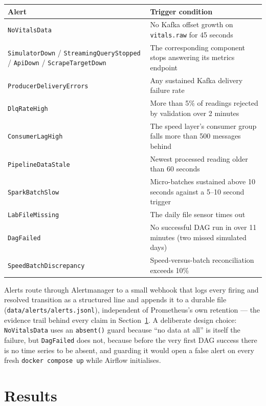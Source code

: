 \documentclass[11pt,a4paper]{article}
\newcommand{\code}[1]{\texttt{\small #1}}
\begin{document}
\begin{longtable}{@{}L{4.5cm}L{10cm}@{}}
\toprule
\textbf{Alert} & \textbf{Trigger condition} \\
\midrule
\endhead
\code{NoVitalsData} & No Kafka offset growth on \code{vitals.raw} for 45 seconds \\
\code{SimulatorDown} / \code{StreamingQueryStopped} / \code{ApiDown} / \code{ScrapeTargetDown} & The corresponding component stops answering its metrics endpoint \\
\code{ProducerDeliveryErrors} & Any sustained Kafka delivery failure rate \\
\code{DlqRateHigh} & More than 5\% of readings rejected by validation over 2 minutes \\
\code{ConsumerLagHigh} & The speed layer's consumer group falls more than 500 messages behind \\
\code{PipelineDataStale} & Newest processed reading older than 60 seconds \\
\code{SparkBatchSlow} & Micro-batches sustained above 10 seconds against a 5--10 second trigger \\
\code{LabFileMissing} & The daily file sensor times out \\
\code{DagFailed} & No successful DAG run in over 11 minutes (two missed simulated days) \\
\code{SpeedBatchDiscrepancy} & Speed-versus-batch reconciliation exceeds 10\% \\
\bottomrule
\end{longtable}

Alerts route through Alertmanager to a small webhook that logs every firing and resolved transition
as a structured line and appends it to a durable file (\code{data/alerts/alerts.jsonl}), independent
of Prometheus's own retention --- the evidence trail behind every claim in Section~\ref{sec:results}.
A deliberate design choice: \code{NoVitalsData} uses an \code{absent()} guard because ``no data at
all'' is itself the failure, but \code{DagFailed} does not, because before the very first DAG success
there is no time series to be absent, and guarding it would open a false alert on every fresh
\code{docker compose up} while Airflow initialises.

\section{Results}
\label{sec:results}
\end{document}
